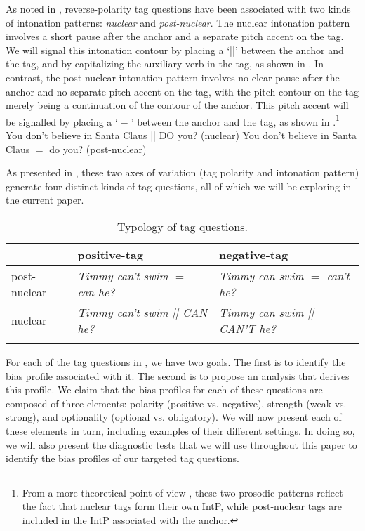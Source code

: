 \documentclass[output=paper,colorlinks,citecolor=brown]{langscibook}
\begin{document}
As noted in \citet{Ladd1981a}, reverse-polarity tag questions have been associated with two kinds of intonation patterns: \textit{nuclear} and \textit{post-nuclear}. The nuclear intonation pattern involves a short pause after the anchor and a separate pitch accent on the tag. We will signal this intonation contour by placing a `||' between the anchor and the tag, and by capitalizing the auxiliary verb in the tag, as shown in . In contrast, the post-nuclear intonation pattern involves no clear pause after the anchor and no separate pitch accent on the tag, with the pitch contour on the tag merely being a continuation of the contour of the anchor. This pitch accent will be signalled by placing a `$=$' between the anchor and the tag, as shown in .\footnote{From a more theoretical point of view \citep{Selkirk2005}, these two prosodic patterns reflect the fact that nuclear tags form their own IntP, while post-nuclear tags are included in the IntP associated with the anchor. }
\is{}
\ea You don't believe in Santa Claus || DO you?\label{Nu} \hfill (nuclear)
\ex You don't believe in Santa Claus $=$ do you?\label{PNu} \hfill (post-nuclear)
\z
{}

\noindent
As presented in , these two axes of variation (tag polarity and intonation pattern) generate four distinct kinds of tag questions, all of which we will be exploring in the current paper.

\begin{table}
 \begin{tabularx}{\textwidth}{lXX}
  \lsptoprule
            & positive-tag  & negative-tag  \\
  \midrule
  post-nuclear  &   \textit{Timmy can't swim $=$ can he?}  & \textit{Timmy can swim $=$ can't he?}   \\
  nuclear  &  \textit{Timmy can't swim || CAN he?}  &   \textit{Timmy can swim || CAN'T he?} \\
  \lspbottomrule
 \end{tabularx}
 \caption{Typology of tag questions.}
\label{tq.targeted}
\end{table}

For each of the tag questions in , we have two goals. The first is to identify the bias profile associated with it. The second is to propose an analysis that derives this profile. We claim that the bias profiles for each of these questions are composed of three elements: polarity (positive vs. negative), strength (weak vs. strong), and optionality (optional vs. obligatory). We will now present each of these elements in turn, including examples of their different settings. In doing so, we will also present the diagnostic tests that we will use throughout this paper to identify the bias profiles of our targeted tag questions. 
\end{document}
